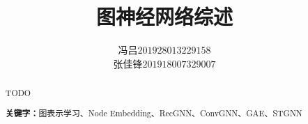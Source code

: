 \documentclass{ctexart}
\title{图神经网络综述}
\author{\begin{tabular}{ll}冯吕 & $201928013229158$\\
	张佳锋 & $201918007329007$
\end{tabular}}
\date{}
\begin{document}

\maketitle
{}
\begin{abstract}

TODO

\centering
\textbf{关键字：}图表示学习、Node Embedding、RecGNN、ConvGNN、GAE、STGNN
\end{abstract}








\newpage

\end{document}
